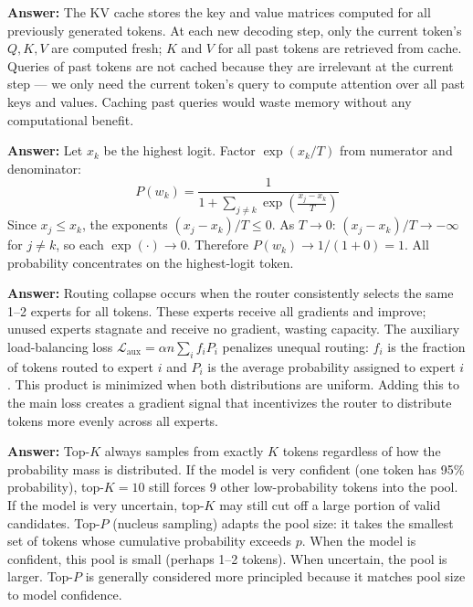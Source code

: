 \documentclass[11pt, a4paper]{article}
\begin{document}
\begin{notebox}
\textbf{Answer:} The KV cache stores the key and value matrices computed for all previously generated tokens. At each new decoding step, only the current token's $Q, K, V$ are computed fresh; $K$ and $V$ for all past tokens are retrieved from cache. Queries of past tokens are not cached because they are irrelevant at the current step --- we only need the current token's query to compute attention over all past keys and values. Caching past queries would waste memory without any computational benefit.
\end{notebox}

\begin{notebox}
\textbf{Answer:} Let $x_k$ be the highest logit. Factor $\exp(x_k/T)$ from numerator and denominator:
\[
P(w_k) = \frac{1}{1 + \sum_{j \neq k}\exp\!\left(\frac{x_j - x_k}{T}\right)}
\]
Since $x_j \leq x_k$, the exponents $(x_j - x_k)/T \leq 0$. As $T \to 0$: $(x_j - x_k)/T \to -\infty$ for $j \neq k$, so each $\exp(\cdot) \to 0$. Therefore $P(w_k) \to 1/(1 + 0) = 1$. All probability concentrates on the highest-logit token.
\end{notebox}

\begin{notebox}
\textbf{Answer:} Routing collapse occurs when the router consistently selects the same 1--2 experts for all tokens. These experts receive all gradients and improve; unused experts stagnate and receive no gradient, wasting capacity. The auxiliary load-balancing loss $\mathcal{L}_{\text{aux}} = \alpha n \sum_i f_i P_i$ penalizes unequal routing: $f_i$ is the fraction of tokens routed to expert $i$ and $P_i$ is the average probability assigned to expert $i$. This product is minimized when both distributions are uniform. Adding this to the main loss creates a gradient signal that incentivizes the router to distribute tokens more evenly across all experts.
\end{notebox}

\begin{notebox}
\textbf{Answer:} Top-$K$ always samples from exactly $K$ tokens regardless of how the probability mass is distributed. If the model is very confident (one token has 95\% probability), top-$K=10$ still forces 9 other low-probability tokens into the pool. If the model is very uncertain, top-$K$ may still cut off a large portion of valid candidates. Top-$P$ (nucleus sampling) adapts the pool size: it takes the smallest set of tokens whose cumulative probability exceeds $p$. When the model is confident, this pool is small (perhaps 1--2 tokens). When uncertain, the pool is larger. Top-$P$ is generally considered more principled because it matches pool size to model confidence.
\end{notebox}
\end{document}

